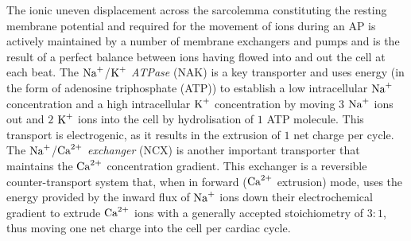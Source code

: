 \vspace{0.2cm}
The ionic uneven displacement across the sarcolemma constituting the resting membrane potential and required for the movement of ions during an AP is actively maintained by a number of membrane exchangers and pumps and is the result of a perfect balance between ions having flowed into and out the cell at each beat. The $\textrm{Na}^{+}$/$\textrm{K}^{+}$ \textit{ATPase} (\acs{NAK}) is a key transporter and uses energy (in the form of adenosine triphosphate (\acs{ATP})) to establish a low intracellular $\textrm{Na}^{+}$ concentration and a high intracellular $\textrm{K}^{+}$ concentration by moving $3$ $\textrm{Na}^{+}$ ions out and $2$ $\textrm{K}^{+}$ ions into the cell by hydrolisation of $1$ ATP molecule. This transport is electrogenic, as it results in the extrusion of $1$ net charge per cycle. The $\textrm{Na}^{+}$/$\textrm{Ca}^{2+}$ \textit{exchanger} (\acs{NCX}) is another important transporter that maintains the $\textrm{Ca}^{2+}$ concentration gradient. This exchanger is a reversible counter-transport system that, when in forward ($\textrm{Ca}^{2+}$ extrusion) mode, uses the energy provided by the inward flux of $\textrm{Na}^{+}$ ions down their electrochemical gradient to extrude $\textrm{Ca}^{2+}$ ions with a generally accepted stoichiometry of $3\colon 1$, thus moving one net charge into the cell per cardiac cycle.

